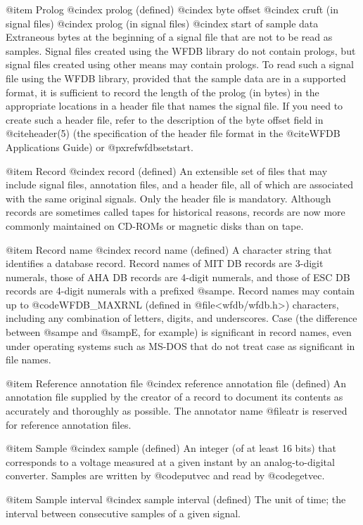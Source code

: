 {{{{{{{{{@item Prolog
@cindex prolog (defined)
@cindex byte offset
@cindex cruft (in signal files)
@cindex prolog (in signal files)
@cindex start of sample data
Extraneous bytes at the beginning of a signal file that are not to be
read as samples.  Signal files created using the WFDB library do not
contain prologs, but signal files created using other means may contain
prologs.  To read such a signal file using the WFDB library, provided that
the sample data are in a supported format, it is sufficient to record the
length of the prolog (in bytes) in the appropriate locations in a
header file that names the signal file.  If you need to create
such a header file, refer to the description of the byte offset
field in @cite{header(5)} (the specification of the header file
format in the @cite{WFDB Applications Guide}) or
@pxref{wfdbsetstart}.

@item Record
@cindex record (defined)
An extensible set of files that may include signal files, annotation
files, and a header file, all of which are associated with the
same original signals.  Only the header file is mandatory.
Although records are sometimes called tapes for historical reasons,
records are now more commonly maintained on CD-ROMs or magnetic disks
than on tape.

@item Record name
@cindex record name (defined)
A character string that identifies a database record.  Record names of
MIT DB records are 3-digit numerals, those of AHA DB records are 4-digit
numerals, and those of ESC DB records are 4-digit numerals with a
prefixed @samp{e}.  Record names may contain up to @code{WFDB_MAXRNL}
(defined in @file{<wfdb/wfdb.h>}) characters, including any combination of
letters, digits, and underscores.  Case (the difference between @samp{e}
and @samp{E}, for example) is significant in record names, even under
operating systems such as MS-DOS that do not treat case as significant
in file names.

@item Reference annotation file
@cindex reference annotation file (defined)
An annotation file supplied by the creator of a record to document its
contents as accurately and thoroughly as possible.  The annotator name
@file{atr} is reserved for reference annotation files.

@item Sample
@cindex sample (defined)
An integer (of at least 16 bits) that corresponds to a voltage measured
at a given instant by an analog-to-digital converter.  Samples are
written by @code{putvec} and read by @code{getvec}.

@item Sample interval
@cindex sample interval (defined)
The unit of time;  the interval between consecutive samples of a given
signal.

}}}}}}}}}
